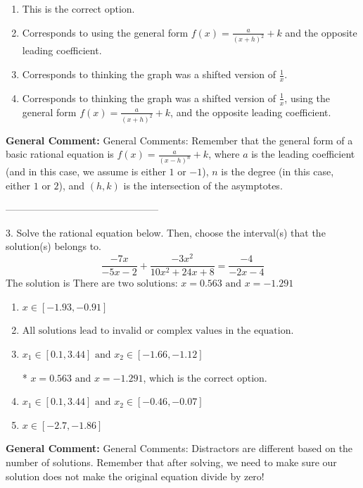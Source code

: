 \documentclass{extbook}[14pt]
\begin{document}
\begin{enumerate}[label=\Alph*.] 
\item This is the correct option.  
\item Corresponds to using the general form $f(x) = \frac{a}{(x+h)^2}+k$ and the opposite leading coefficient.  
\item Corresponds to thinking the graph was a shifted version of $\frac{1}{x}$.  
\item Corresponds to thinking the graph was a shifted version of $\frac{1}{x}$, using the general form $f(x) = \frac{a}{(x+h)^2}+k$, and the opposite leading coefficient.  
\end{enumerate} 
 
\textbf{General Comment:} General Comments: Remember that the general form of a basic rational equation is $ f(x) = \frac{a}{(x-h)^n} + k$, where $a$ is the leading coefficient (and in this case, we assume is either $1$ or $-1$), $n$ is the degree (in this case, either $1$ or $2$), and $(h, k)$ is the intersection of the asymptotes. 

-----------------------------------------------

3. Solve the rational equation below. Then, choose the interval(s) that the solution(s) belongs to.
\[ \frac{-7x}{-5x -2} + \frac{-3x^{2}}{10x^{2} +24 x + 8} = \frac{-4}{-2x -4} \] 
The solution is $ \text{There are two solutions: } x = 0.563 \text{ and } x = -1.291 $ 

\begin{enumerate}[label=\Alph*.] 
\item $ x \in [-1.93,-0.91] $ 

  
\item $ \text{All solutions lead to invalid or complex values in the equation.} $ 

  
\item $ x_1 \in [0.1, 3.44] \text{ and } x_2 \in [-1.66,-1.12] $ 

 * $x = 0.563 \text{ and } x = -1.291$, which is the correct option. 
\item $ x_1 \in [0.1, 3.44] \text{ and } x_2 \in [-0.46,-0.07] $ 

  
\item $ x \in [-2.7,-1.86] $ 

  
\end{enumerate} 
 
\textbf{General Comment:} General Comments: Distractors are different based on the number of solutions. Remember that after solving, we need to make sure our solution does not make the original equation divide by zero! 
\end{document}
